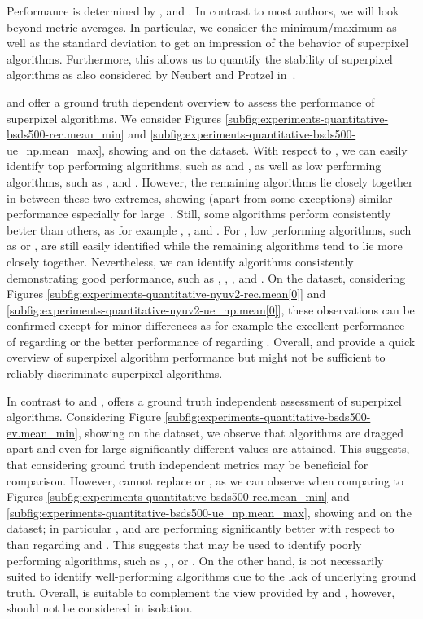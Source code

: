 Performance is determined by \Rec, \UE and \EV. In contrast to most authors,
we will look beyond metric averages. In particular, we consider the
minimum/maximum as well as the standard deviation to get an impression of the behavior of superpixel algorithms.
Furthermore, this allows us to quantify the stability of superpixel algorithms as
also considered by Neubert and Protzel in~\cite{NeubertProtzel:2013}.

\Rec and \UE offer a ground truth dependent overview to assess the performance of
superpixel algorithms. We consider
Figures \ref{subfig:experiments-quantitative-bsds500-rec.mean_min} and \ref{subfig:experiments-quantitative-bsds500-ue_np.mean_max},
showing \Rec and \UE on the \BSDS dataset. With respect to \Rec, we can easily identify top performing
algorithms, such as \ETPSr and \SEEDSr, as well as low performing algorithms,
such as \FHr, \QSr and \PFr. However, the remaining algorithms lie closely together
in between these two extremes, showing (apart from some exceptions) similar performance
especially for large~\K. Still, some algorithms perform consistently better than others,
as for example \ERGCr, \SLICr, \ERSr and \CRSr. For \UE, low performing algorithms,
such as \PFr or \QSr, are still easily identified while the remaining algorithms
tend to lie more closely together. Nevertheless, we can identify algorithms consistently
demonstrating good performance, such as \ERGCr, \ETPSr, \CRSr, \SLICr and \ERSr.
On the \NYU dataset, considering Figures \ref{subfig:experiments-quantitative-nyuv2-rec.mean[0]} and \ref{subfig:experiments-quantitative-nyuv2-ue_np.mean[0]},
these observations can be confirmed except for minor differences as for example the
excellent performance of \ERS regarding \UE or the better performance of \QS regarding \UE.
Overall, \Rec and \UE provide a quick overview of superpixel algorithm performance
but might not be sufficient to reliably discriminate superpixel algorithms.

In contrast to \Rec and \UE, \EV offers a ground truth independent assessment of superpixel algorithms.
Considering Figure \ref{subfig:experiments-quantitative-bsds500-ev.mean_min}, showing \EV on the \BSDS dataset,
we observe that algorithms are dragged apart and even for large \K
significantly different \EV values are attained. This suggests, that considering
ground truth independent metrics may be beneficial for comparison. However, \EV
cannot replace \Rec or \UE, as we can observe when comparing to
Figures \ref{subfig:experiments-quantitative-bsds500-rec.mean_min} and \ref{subfig:experiments-quantitative-bsds500-ue_np.mean_max},
showing \Rec and \UE on the \BSDS dataset; in particular
\QSr, \FHr and \CISr are performing significantly better with respect to \EV than regarding \Rec and \UE.
This suggests that \EV may be used to identify poorly performing algorithms, such as \TPSr, \PFr, \PBr or \NCr.
On the other hand, \EV is not necessarily suited to identify well-performing algorithms
due to the lack of underlying ground truth.
Overall, \EV is suitable to complement the view provided by \Rec and \UE,
however, should not be considered in isolation.

